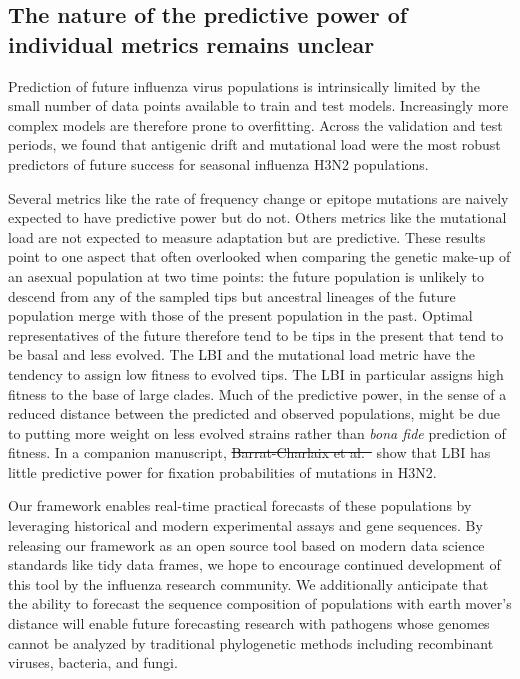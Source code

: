 \documentclass[9pt,lineno]{elife} %
\providecommand{\DIFdel}[1]{{\protect\color{red}\sout{#1}}}                      %
\providecommand{\DIFaddbegin}{} %
\providecommand{\DIFaddend}{} %
\providecommand{\DIFdelbegin}{} %
\providecommand{\DIFdelend}{} %
\providecommand{\DIFdeltex}[1]{{\protect\color{red}\sout{#1}}}                      %
\providecommand{\DIFaddbegin}{} %
\providecommand{\DIFaddend}{} %
\providecommand{\DIFdelbegin}{} %
\providecommand{\DIFdelend}{} %
\providecommand{\DIFdel}[1]{\texorpdfstring{\DIFdeltex{#1}}{}} %
\newcommand{\DIFscaledelfig}{0.5}
\newlength{\DIFdelgraphicswidth} %
\newlength{\DIFdelgraphicsheight} %
\newcommand{\DIFaddincludegraphics}[2][]{{\color{blue}\fbox{\DIFOincludegraphics[#1]{#2}}}} %
\newcommand{\DIFdelincludegraphics}[2][]{%
\sbox{\DIFdelgraphicsbox}{\DIFOincludegraphics[#1]{#2}}%
\settoboxwidth{\DIFdelgraphicswidth}{\DIFdelgraphicsbox} %
\settoboxtotalheight{\DIFdelgraphicsheight}{\DIFdelgraphicsbox} %
\scalebox{\DIFscaledelfig}{%
\parbox[b]{\DIFdelgraphicswidth}{\usebox{\DIFdelgraphicsbox}\\[-\baselineskip] \rule{\DIFdelgraphicswidth}{0em}}\llap{\resizebox{\DIFdelgraphicswidth}{\DIFdelgraphicsheight}{%
\setlength{\unitlength}{\DIFdelgraphicswidth}%
\begin{picture}(1,1)%
\thicklines\linethickness{2pt} %
{\color[rgb]{1,0,0}\put(0,0){\framebox(1,1){}}}%
{\color[rgb]{1,0,0}\put(0,0){\line( 1,1){1}}}%
{\color[rgb]{1,0,0}\put(0,1){\line(1,-1){1}}}%
\end{picture}%
}\hspace*{3pt}}} %
} %
\DeclareRobustCommand{\DIFaddbegin}{\DIFOaddbegin \let\includegraphics\DIFaddincludegraphics} %
\DeclareRobustCommand{\DIFaddend}{\DIFOaddend \let\includegraphics\DIFOincludegraphics} %
\DeclareRobustCommand{\DIFdelbegin}{\DIFOdelbegin \let\includegraphics\DIFdelincludegraphics} %
\DeclareRobustCommand{\DIFdelend}{\DIFOaddend \let\includegraphics\DIFOincludegraphics} %
\begin{document}
\subsection*{The nature of the predictive power of individual metrics remains unclear}

Prediction of future influenza virus populations is intrinsically limited by the small number of data points available to train and test models.
Increasingly more complex models are therefore prone to overfitting.
Across the validation and test periods, we found that antigenic drift and mutational load were the most robust predictors of future success for seasonal influenza H3N2 populations.

Several metrics like the rate of frequency change or epitope mutations are naively expected to have predictive power but do not.
Others metrics like the mutational load are not expected to measure adaptation but are predictive.
These results point to one aspect that often overlooked when comparing the genetic make-up of an asexual population at two time points: the future population is unlikely to descend from any of the sampled tips but ancestral lineages of the future population merge with those of the present population in the past.
Optimal representatives of the future therefore tend to be tips in the present that tend to be basal and less evolved.
The LBI and the mutational load metric have the tendency to assign low fitness to evolved tips.
The LBI in particular assigns high fitness to the base of large clades.
Much of the predictive power, in the sense of a reduced distance between the predicted and observed populations, might be due to putting more weight on less evolved strains rather than \emph{bona fide} prediction of fitness.
In a companion manuscript, \DIFdelbegin \DIFdel{Barrat-Charlaix et al.~}\DIFdelend \DIFaddbegin \cite{Barrat-Charlaix2020} \DIFaddend show that LBI has little predictive power for fixation probabilities of mutations in H3N2.

Our framework enables real-time practical forecasts of these populations by leveraging historical and modern experimental assays and gene sequences.
By releasing our framework as an open source tool based on modern data science standards like tidy data frames, we hope to encourage continued development of this tool by the influenza research community.
We additionally anticipate that the ability to forecast the sequence composition of populations with earth mover's distance will enable future forecasting research with pathogens whose genomes cannot be analyzed by traditional phylogenetic methods including recombinant viruses, bacteria, and fungi.
\end{document}
